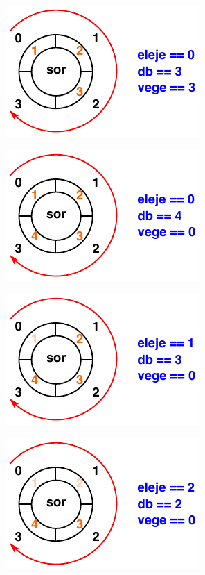 \documentclass[usenames,dvipsnames,aspectratio=169]{beamer}
\begin{document}
\begin{frame}
  \begin{center}
    \includegraphics[scale=1.5]{sor/sor04.pdf}
  \end{center}
\end{frame}

\begin{frame}
  \begin{center}
    \includegraphics[scale=1.5]{sor/sor05.pdf}
  \end{center}
\end{frame}

\begin{frame}
  \begin{center}
    \includegraphics[scale=1.5]{sor/sor06.pdf}
  \end{center}
\end{frame}

\begin{frame}
  \begin{center}
    \includegraphics[scale=1.5]{sor/sor07.pdf}
  \end{center}
\end{frame}
\end{document}
